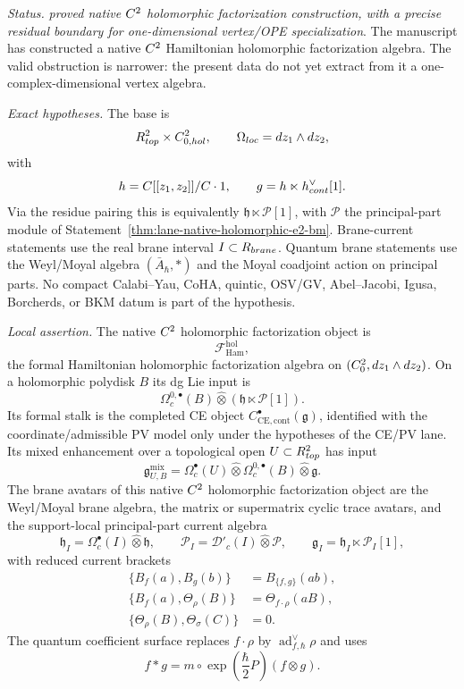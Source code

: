 \begin{stmt}\label{thm:lane-holomorphic-defect-voa-restriction}
  \emph{Status.} \emph{proved native \(C^2\) holomorphic factorization construction,
  with a precise residual boundary for one-dimensional vertex/OPE
  specialization}.  The manuscript has constructed a native \(C^2\)
  Hamiltonian holomorphic factorization algebra.  The valid obstruction is
  narrower: the present data do not yet extract from it a
  one-complex-dimensional vertex algebra.

  \emph{Exact hypotheses.} The base is
  \[
    R^2_{top}\times
    C^2_{0,hol},
    \qquad \Omega_{loc}=dz_1\wedge dz_2 ,
  \]
  with
  \[
    h=C[[z_1,z_2]]/C\cdot1,\qquad
    g=h\ltimes
    h^\vee_{cont}[1].
  \]
  Via the residue pairing this is equivalently
  \(\mathfrak h\ltimes\mathcal P[1]\), with \(\mathcal P\) the
  principal-part module of
  Statement~\ref{thm:lane-native-holomorphic-e2-bm}.
  Brane-current statements use the real brane interval
  \(I\subset R_{brane}\).  Quantum brane statements use the
  Weyl/Moyal algebra \((\bar A_\hbar,*)\) and the Moyal coadjoint action
  on principal parts.  No compact Calabi--Yau, CoHA, quintic, OSV/GV,
  Abel--Jacobi, Igusa, Borcherds, or BKM datum is part of the hypothesis.

  \emph{Local assertion.} The native \(C^2\) holomorphic factorization
  object is
  \[
    \mathcal F_{\mathrm{Ham}}^{\mathrm{hol}},
  \]
  the formal Hamiltonian holomorphic factorization algebra on
  \((C^2_0,dz_1\wedge dz_2)\).  On a holomorphic polydisk
  \(B\) its dg Lie input is
  \[
    \Omega^{0,\bullet}_c(B)\widehat\otimes
    (\mathfrak h\ltimes\mathcal P[1]) .
  \]
  Its formal stalk is the completed CE object
  \(C^\bullet_{\mathrm{CE},\mathrm{cont}}(\mathfrak g)\), identified with
  the coordinate/admissible PV model only under the hypotheses of the
  CE/PV lane.  Its mixed enhancement over a topological open
  \(U\subset R^2_{top}\) has input
  \[
    \mathfrak g^{\mathrm{mix}}_{U,B}
    =
    \Omega^\bullet_c(U)\widehat\otimes
    \Omega^{0,\bullet}_c(B)\widehat\otimes\mathfrak g .
  \]
  The brane avatars of this native \(C^2\) holomorphic factorization object are the
  Weyl/Moyal brane algebra, the matrix or supermatrix cyclic trace
  avatars, and the support-local principal-part current algebra
  \[
    \mathfrak h_I=\Omega^\bullet_c(I)\widehat\otimes\mathfrak h,\qquad
    \mathcal P_I=\mathcal D'_c(I)\widehat\otimes\mathcal P,\qquad
    \mathfrak g_I=\mathfrak h_I\ltimes\mathcal P_I[1],
  \]
  with reduced current brackets
  \[
    \begin{aligned}
    \{B_f(a),B_g(b)\}&=B_{\{f,g\}}(ab),\\
    \{B_f(a),\Theta_\rho(B)\}&=\Theta_{f\cdot\rho}(aB),\\
    \{\Theta_\rho(B),\Theta_\sigma(C)\}&=0 .
    \end{aligned}
  \]
  The quantum coefficient surface replaces \(f\cdot\rho\) by
  \(\operatorname{ad}^{\vee}_{f,\hbar}\rho\) and uses
  \[
    f*g=m\circ\exp\!\left(\frac{\hbar}{2}P\right)(f\otimes g).
  \]


\end{stmt}
